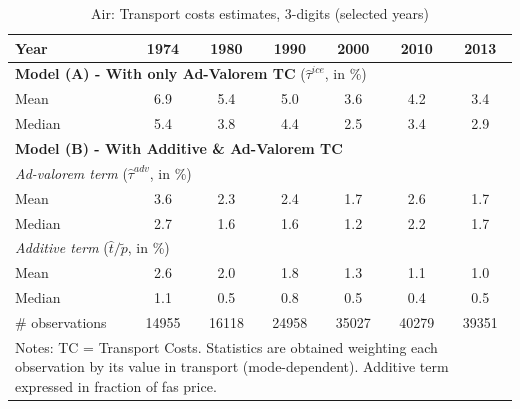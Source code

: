 \documentclass[a4paper,11pt]{article}
\begin{document}
\begin{table}[htbp]
  \centering
  \caption{Air: Transport costs estimates, 3-digits (selected years)}
\begin{center}
    \begin{tabular}{l|cccccc}
\hline\hline
Year & 1974  & 1980  & 1990  & 2000  & 2010  & 2013   \\
\hline
\multicolumn{7}{l}{\textbf{Model (A) - With only Ad-Valorem TC} ($\widehat{\tau}^{ice}$, in \%)}     \\
\hline
Mean  & 6.9& 5.4 &5.0 & 3.6 & 4.2 & 3.4  \\
Median & 5.4 & 3.8 & 4.4 & 2.5 & 3.4 & 2.9  \\
\hline
\multicolumn{7}{l}{\textbf{Model (B) - With Additive \& Ad-Valorem TC}}    \\
\hline
\multicolumn{7}{l}{\textit{Ad-valorem term} ($\widehat{\tau}^{adv}$, in \%)}  \\ \hline
Mean & 3.6 & 2.3 & 2.4 &1.7 & 2.6 & 1.7  \\
Median & 2.7 & 1.6 & 1.6 & 1.2 & 2.2 & 1.7 \\

\hline
\multicolumn{7}{l}{\textit{Additive term} ($\widehat{t}/\widetilde{p}$, in \%)}     \\ \hline
Mean & 2.6 & 2.0 & 1.8 & 1.3 & 1.1 & 1.0  \\
Median & 1.1 & 0.5 & 0.8 & 0.5 & 0.4 & 0.5  \\
\hline
\# observations & 14955 & 16118 & 24958 & 35027 & 40279 & 39351  \\
\hline\hline
\multicolumn{7}{l}{\parbox[l]{11cm}{ \vspace{7pt}\scriptsize{Notes: TC = Transport Costs. Statistics are obtained weighting each observation by its value in transport (mode-dependent). Additive term expressed in fraction of fas price.}}}
\end{tabular}%
\end{center}
\label{tab:result_air_3d_detail}
\end{table}%
\end{document}

